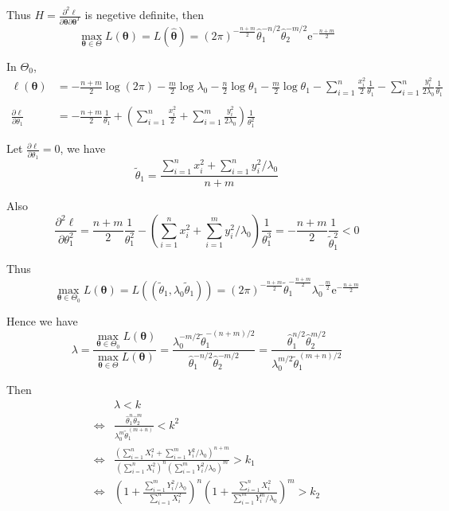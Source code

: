 \documentclass{article}
\begin{document}
\begin{enumerate}[leftmargin = 0 em, label = \arabic*., font = \bfseries]
\begin{enumerate}
	Thus $H = \frac{\partial^2 \ell}{\partial\bm \theta \partial \bm \theta^T }$ is negetive definite, then 
	\[\max_{\bm \theta \in \Theta} L(\bm \theta) = L(\hat{\bm \theta}) = (2 \pi)^{-\frac{n+m}{2}} \hat{\theta}_1^{-n/2} \hat{\theta}_2^{-m/2} \mathrm{e}^{-\frac{n+m}{2}}\]

	In $\Theta_0$,
	\begin{align*}
	\ell (\bm \theta) &= -\frac{n+m}{2} \log (2 \pi) - \frac{m}{2} \log \lambda_0 - \frac{n}{2} \log \theta_1 - \frac{m}{2} \log \theta_1 - \sum_{i=1}^n \frac{x_i^2}{2} \frac{1}{\theta_1} - \sum_{i=1}^n \frac{y_i^2}{2 \lambda_0} \frac{1}{\theta_1}\\
	\\
	\frac{\partial \ell}{\partial \theta_1} & = -\frac{n+m}{2} \frac{1}{\theta_1} + \left( \sum_{i=1}^n \frac{x_i^2}{2} + \sum_{i=1}^m \frac{y_i^2}{2 \lambda_0} \right) \frac{1}{\theta_1^2}
	\end{align*}

	Let $\frac{\partial \ell}{\partial \theta_1} = 0$, we have
	\[\tilde{\theta}_1 = \frac{\sum_{i=1}^n x_i^2 + \sum_{i=1}^n y_i^2/\lambda_0}{n+m}\]

	Also
	\[\frac{\partial^2 \ell}{\partial \theta_1^2} = \frac{n+m}{2} \frac{1}{\theta_1^2} - \left( \sum_{i=1}^n x_i^2 + \sum_{i=1}^m y_i^2/\lambda_0 \right) \frac{1}{\theta_1^3} = - \frac{n+m}{2} \frac{1}{\tilde{\theta}_1^2} < 0 \]

	Thus
	\[\max_{\bm \theta \in \Theta_0} L(\bm \theta) = L((\tilde{\theta}_1, \lambda_0 \tilde{\theta}_1)) = (2 \pi)^{-\frac{n+m}{2}} \tilde{\theta}_1^{-\frac{n+m}{2}} \lambda_0^{- \frac{m}{2}} \mathrm{e}^{-\frac{n+m}{2}}\]

	Hence we have
	\[\lambda = \frac{\max_{\bm \theta \in \Theta_0} L(\bm \theta)}{\max_{\bm \theta \in \Theta} L(\bm \theta)} = \frac{\lambda_0^{- m /2} \tilde{\theta}_1^{- (n+m)/2}}{\hat{\theta}_1^{ - n/2} \hat{\theta}_2^{-m/2}} = \frac{\hat{\theta}_{1}^{n/2} \hat{\theta}_{2}^{m/2}}{\lambda_0^{m/2} \tilde{\theta}_1^{(m+n)/2}}\]

	Then 
	\begin{align*}
	& \lambda < k\\
	\iff & \frac{\hat{\theta}_{1}^{n} \hat{\theta}_{2}^{m}}{\lambda_0^{m} \tilde{\theta}_1^{(m+n)}} < k^2 \\
	\iff & \frac{\left( \sum_{i=1}^n X_i^2 + \sum_{i=1}^m Y_i^2 / \lambda_0 \right)^{n + m}}{\left( \sum_{i=1}^n X_i^2 \right)^{n} \left( \sum_{i=1}^m Y_i^2 / \lambda_0 \right)^m  } > k_1 \\
	\iff & \left(  1 + \frac{\sum_{i=1}^m Y_i^2 / \lambda_0}{\sum_{i=1}^n X_i^2} \right)^n \left( 1 + \frac{\sum_{i=1}^n X_i^2}{\sum_{i=1}^m Y_i^m / \lambda_0 } \right)^m > k_2  
		\end{align*}


\end{enumerate}
\end{enumerate}
\end{document}
